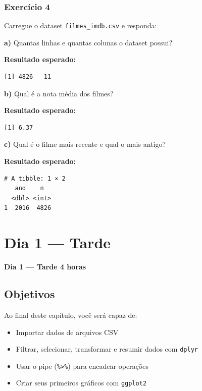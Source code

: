\documentclass[
  letterpaper,
]{scrbook}
\providecommand{\tightlist}{%
  \setlength{\itemsep}{0pt}\setlength{\parskip}{0pt}}
\begin{document}
\subsection{Exercício 4}\label{exercuxedcio-4-3}

Carregue o dataset \texttt{filmes\_imdb.csv} e responda:

\textbf{a)} Quantas linhas e quantas colunas o dataset possui?

\textbf{Resultado esperado:}

\begin{verbatim}
[1] 4826   11
\end{verbatim}

\textbf{b)} Qual é a nota média dos filmes?

\textbf{Resultado esperado:}

\begin{verbatim}
[1] 6.37
\end{verbatim}

\textbf{c)} Qual é o filme mais recente e qual o mais antigo?

\textbf{Resultado esperado:}

\begin{verbatim}
# A tibble: 1 × 2
   ano    n
  <dbl> <int>
1  2016  4826
\end{verbatim}

\chapter{Dia 1 --- Tarde}\label{dia-1-tarde-2}

\textbf{Dia 1 --- Tarde \textbar{} 4 horas}

\section*{Objetivos}\label{objetivos-1}


Ao final deste capítulo, você será capaz de:

\begin{itemize}
\tightlist
\item
  Importar dados de arquivos CSV
\item
  Filtrar, selecionar, transformar e resumir dados com \texttt{dplyr}
\item
  Usar o pipe (\texttt{\%\textgreater{}\%}) para encadear operações
\item
  Criar seus primeiros gráficos com \texttt{ggplot2}
\end{itemize}
\end{document}

